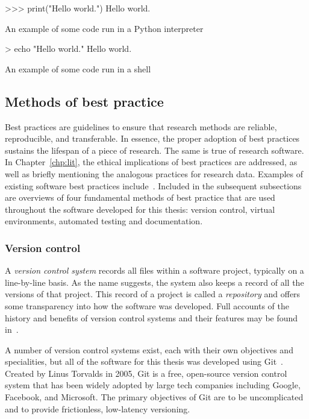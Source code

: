 \begin{listing}[htbp]
\begin{usagepy}
>>> print("Hello world.")
Hello world.

\end{usagepy}
\caption{An example of some code run in a Python interpreter}\label{snp:usepy}
\end{listing}

\begin{listing}[htbp]
\begin{usagesh}
> echo "Hello world."
Hello world.
\end{usagesh}
\caption{An example of some code run in a shell}\label{snp:usesh}
\end{listing}

\subsection{Methods of best practice}

Best practices are guidelines to ensure that research methods are reliable,
reproducible, and transferable. In essence, the proper adoption of best
practices sustains the lifespan of a piece of research. The same is true of
research software. In Chapter~\ref{chp:lit}, the ethical implications of best
practices are addressed, as well as briefly mentioning the analogous practices
for research data. Examples of existing software best practices
include~\cite{Aberdour2007,Benureau2018,Jimenez2017,Wilson2014}. Included in the
subsequent subsections are overviews of four fundamental methods of best
practice that are used throughout the software developed for this thesis:
version control, virtual environments, automated testing and documentation.

\subsubsection{Version control}

A \emph{version control system} records all files within a software project,
typically on a line-by-line basis. As the name suggests, the system also keeps a
record of all the versions of that project. This record of a project is called a
\emph{repository} and offers some transparency into how the software was
developed. Full accounts of the history and benefits of version control systems
and their features may be found in~\cite{Ruparelia2010,Zolkifli2018}.

A number of version control systems exist, each with their own objectives and
specialities, but all of the software for this thesis was developed using
Git~\cite{git}. Created by Linus Torvalds in 2005, Git is a free, open-source
version control system that has been widely adopted by large tech companies
including Google, Facebook, and Microsoft. The primary objectives of Git are to
be uncomplicated and to provide frictionless, low-latency versioning.

